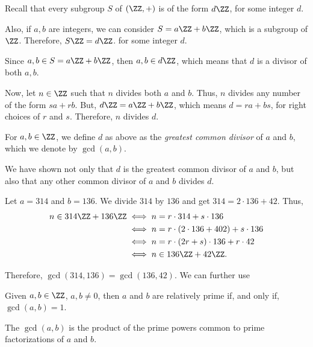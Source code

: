 
Recall that every subgroup $S$ of $(\ZZ, +)$ is of the form $d\ZZ$, for some integer $d$.

Also, if  $a, b$ are integers, we can consider $S = a\ZZ + b\ZZ$, which is a subgroup of $\ZZ$. Therefore, $ S\ZZ = d\ZZ$. for some integer $d$.

Since $a, b \in S = a\ZZ + b\ZZ$, then $a, b \in d\ZZ$, which means that $d$ is a divisor of both $a, b$. 

Now, let $n \in \ZZ$ such that  $n$ divides both  $a$ and $b$. Thus, $n$ divides any number of the form $sa + rb$.
But,  $d\ZZ = a\ZZ + b\ZZ$, which means $d = ra + bs$, for right choices of $r$ and $s$. Therefore, $n$ divides $d$.

\begin{defn}
	 For $a, b \in \ZZ$, we define $d$ as above as the \emph{greatest common divisor} of  $a$ and $b$, which we denote by $\gcd(a, b)$.
\end{defn}

We have shown not only that $d$ is the greatest common divisor of $a$ and $b$, but also that any other common divisor of $a$ and $b$ divides $d$.

\begin{alg}
	
\end{alg}

\begin{exmp}
	Let $a = 314$ and  $b = 136$. We divide $314$ by $136$ and get $314 = 2\cdot 136 + 42.$ Thus, 
	\begin{align*}	
		n \in 314 \ZZ + 136\ZZ & \iff n = r \cdot 314 + s\cdot 136\\
							   & \iff n = r \cdot (2\cdot136 + 402) + s\cdot136\\
							   & \iff n = r \cdot (2r + s) \cdot 136 + r \cdot 42\\
							   & \iff n \in 136 \ZZ + 42\ZZ.
	\end{align*}

	Therefore, $\gcd(314, 136) = \gcd(136, 42)$.
	We can further use 
\end{exmp}

\begin{defn}
	Given $a, b \in \ZZ$,  $a, b \neq 0$, then  $a$ and $b$ are relatively prime if, and only if, $\gcd(a, b) = 1$.
\end{defn}

\begin{prop}
	The $\gcd(a, b)$ is the product of the prime powers common to prime factorizations of $a$ and $b$.
\end{prop}

